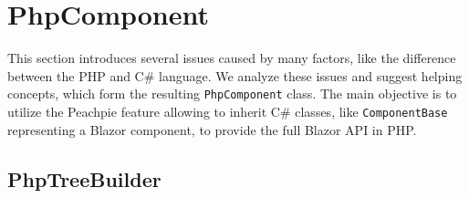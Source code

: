 \section{PhpComponent}

This section introduces several issues caused by many factors, like the difference between the PHP and C\# language.
We analyze these issues and suggest helping concepts, which form the resulting \texttt{PhpComponent} class.
The main objective is to utilize the Peachpie feature allowing to inherit C\# classes, like \texttt{ComponentBase} representing a Blazor component, to provide the full Blazor API in PHP.

\subsection{PhpTreeBuilder}


